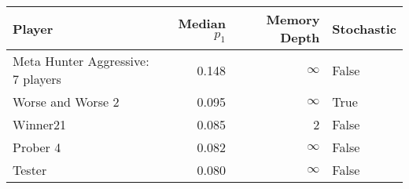 \begin{tabular}{lrrl}
\toprule
                            Player &  Median $p_1$ &  Memory Depth & Stochastic \\
\midrule
 Meta Hunter Aggressive: 7 players &         0.148 &            \(\infty\) &      False \\
                 Worse and Worse 2 &         0.095 &            \(\infty\) &       True \\
                          Winner21 &         0.085 &             2 &      False \\
                          Prober 4 &         0.082 &            \(\infty\) &      False \\
                            Tester &         0.080 &            \(\infty\) &      False \\
\bottomrule
\end{tabular}
